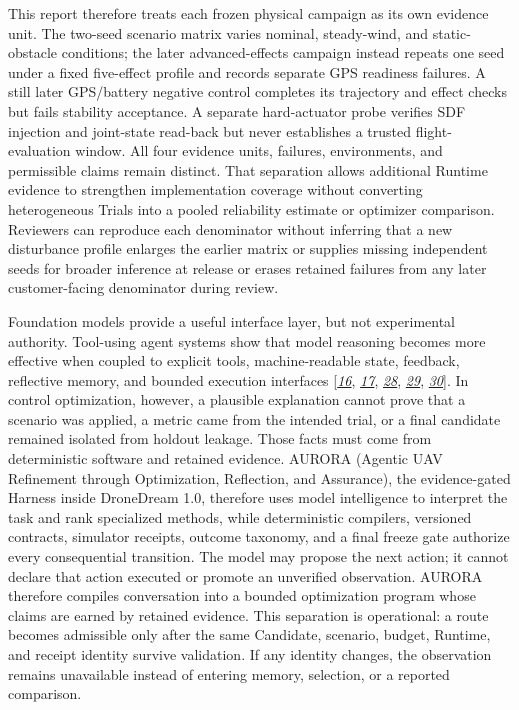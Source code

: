 This report therefore treats each frozen physical campaign as its own
evidence unit. The two-seed scenario matrix varies nominal, steady-wind,
and static-obstacle conditions; the later advanced-effects campaign
instead repeats one seed under a fixed five-effect profile and records
separate GPS readiness failures. A still later GPS/battery negative
control completes its trajectory and effect checks but fails stability
acceptance. A separate hard-actuator probe verifies SDF injection and
joint-state read-back but never establishes a trusted flight-evaluation
window. All four evidence units, failures, environments, and permissible
claims remain distinct. That separation allows additional Runtime evidence
to strengthen implementation coverage without converting heterogeneous
Trials into a pooled reliability estimate or optimizer comparison.
Reviewers can reproduce each denominator without inferring that a new
disturbance profile enlarges the earlier matrix or supplies missing
independent seeds for broader inference at release or erases retained
failures from any later customer-facing denominator during review.

Foundation models provide a useful interface layer, but not experimental
authority. Tool-using agent systems show that model reasoning becomes
more effective when coupled to explicit tools, machine-readable state,
feedback, reflective memory, and bounded execution interfaces
{[}\protect\hyperlink{ref_16}{\emph{16}},
\protect\hyperlink{ref_17}{\emph{17}},
\protect\hyperlink{ref_28}{\emph{28}},
\protect\hyperlink{ref_29}{\emph{29}},
\protect\hyperlink{ref_30}{\emph{30}}{]}. In control optimization,
however, a plausible explanation cannot prove that a scenario was
applied, a metric came from the intended trial, or a final candidate
remained isolated from holdout leakage. Those facts must come from
deterministic software and retained evidence. AURORA (Agentic UAV
Refinement through Optimization, Reflection, and Assurance), the
evidence-gated Harness inside DroneDream 1.0, therefore uses model
intelligence to interpret the task and rank specialized methods, while
deterministic compilers, versioned contracts, simulator receipts, outcome
taxonomy, and a final freeze gate authorize every consequential
transition. The model may propose the next action; it cannot declare
that action executed or promote an unverified observation. AURORA
therefore compiles conversation into a bounded optimization program
whose claims are earned by retained evidence.
This separation is operational: a route becomes admissible only after the
same Candidate, scenario, budget, Runtime, and receipt identity survive
validation. If any identity changes, the observation remains unavailable
instead of entering memory, selection, or a reported comparison.


